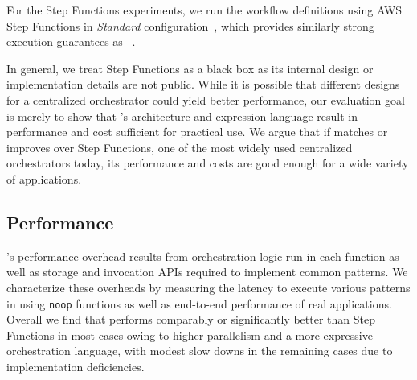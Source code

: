For the Step Functions experiments, we run the workflow definitions using AWS
Step Functions in \emph{Standard}
configuration~\cite{aws-step-functions-standard-vs-express}, which provides
similarly strong execution guarantees as
\name{}~\cite{aws-step-functions-exec-gntee}.

In general, we treat Step Functions as a black box as its internal design or
implementation details are not public. While it is possible that different
designs for a centralized orchestrator could yield better performance, our
evaluation goal is merely to show that \name{}'s architecture and expression
language result in performance and cost sufficient for practical use. We argue
that if \name{} matches or improves over Step Functions, one of the most widely
used centralized orchestrators today, its performance and costs are good enough
for a wide variety of applications.



\subsection{Performance}\label{sec:eval:micro}

\name{}'s performance overhead results from orchestration logic run in each
function as well as  storage and invocation APIs required to implement common
patterns. We characterize these overheads by measuring the latency to execute
various patterns in using \texttt{noop} functions as well as end-to-end
performance of real applications. Overall we find that \name{} performs
comparably or significantly better than Step Functions in most cases owing to
higher parallelism and a more expressive orchestration language, with modest
slow downs in the remaining cases due to implementation deficiencies.

